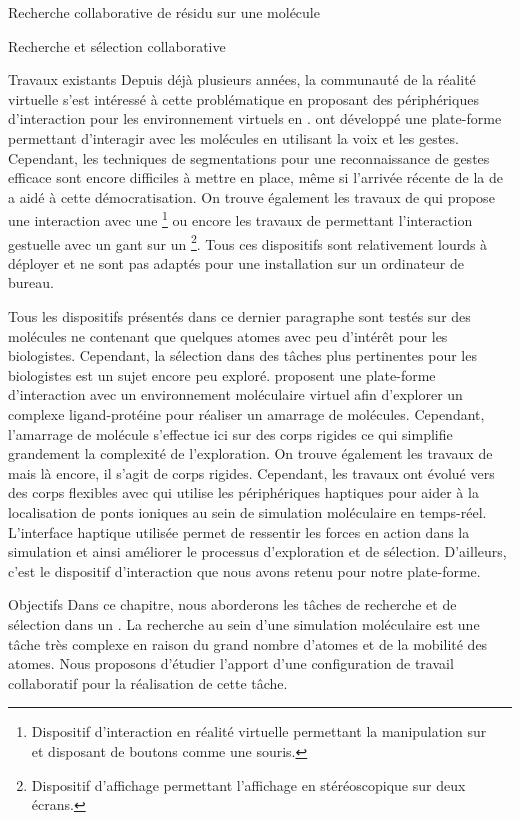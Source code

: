 \documentclass[myfrancais]{mythesis}
\begin{document}
\begin{mychapter}{Recherche collaborative de résidu sur une molécule}
\begin{mysection}{Recherche et sélection collaborative}
\begin{mysubsection}{Travaux existants}
				Depuis déjà plusieurs années, la communauté de la réalité virtuelle s'est intéressé à cette problématique en proposant des périphériques d'interaction pour les environnement virtuels en \myThreeD.
				 ont développé une plate-forme permettant d'interagir avec les molécules en utilisant la voix et les gestes.
				Cependant, les techniques de segmentations pour une reconnaissance de gestes efficace sont encore difficiles à mettre en place, même si l'arrivée récente de la \myKinect de \myMicrosoft a aidé à cette démocratisation.
				On trouve également les travaux de  qui propose une interaction avec une \footnote{Dispositif d'interaction en réalité virtuelle permettant la manipulation sur ~ et disposant de boutons comme une souris.} ou encore les travaux de  permettant l'interaction gestuelle avec un gant sur un \footnote{Dispositif d'affichage permettant l'affichage en \myThreeD stéréoscopique sur deux écrans.}.
				Tous ces dispositifs sont relativement lourds à déployer et ne sont pas adaptés pour une installation sur un ordinateur de bureau.

				Tous les dispositifs présentés dans ce dernier paragraphe sont testés sur des molécules ne contenant que quelques atomes avec peu d'intérêt pour les biologistes.
				Cependant, la sélection dans des tâches plus pertinentes pour les biologistes est un sujet encore peu exploré.
				 proposent une plate-forme d'interaction avec un environnement moléculaire virtuel afin d'explorer un complexe ligand-protéine pour réaliser un amarrage de molécules.
				Cependant, l'amarrage de molécule s'effectue ici sur des corps rigides ce qui simplifie grandement la complexité de l'exploration.
				On trouve également les travaux de  mais là encore, il s'agit de corps rigides.
				Cependant, les travaux ont évolué vers des corps flexibles avec  qui utilise les périphériques haptiques pour aider à la localisation de ponts ioniques au sein de simulation moléculaire en temps-réel.
				L'interface haptique utilisée permet de ressentir les forces en action dans la simulation et ainsi améliorer le processus d'exploration et de sélection.
				D'ailleurs, c'est le dispositif d'interaction que nous avons retenu pour notre plate-forme.
			\end{mysubsection}
			\begin{mysubsection}{Objectifs}
				Dans ce chapitre, nous aborderons les tâches de recherche et de sélection dans un .
				La recherche au sein d'une simulation moléculaire est une tâche très complexe en raison du grand nombre d'atomes et de la mobilité des atomes.
				Nous proposons d'étudier l'apport d'une configuration de travail collaboratif pour la réalisation de cette tâche.


\end{mysubsection}
\end{mysection}
\end{mychapter}
\end{document}
